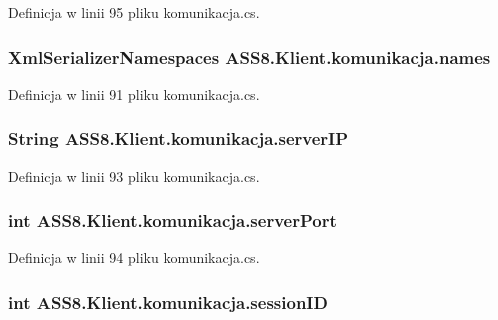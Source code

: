 Definicja w linii 95 pliku komunikacja.cs.\hypertarget{a00013_fad59850af421f7d3a2ad72f29fabe3d}{
\subsubsection[{names}]{\setlength{\rightskip}{0pt plus 5cm}XmlSerializerNamespaces {\bf ASS8.Klient.komunikacja.names}}}
\label{d7/dd4/a00013_fad59850af421f7d3a2ad72f29fabe3d}




Definicja w linii 91 pliku komunikacja.cs.\hypertarget{a00013_596f53c293d3811c950901c69c30aee4}{
\subsubsection[{serverIP}]{\setlength{\rightskip}{0pt plus 5cm}String {\bf ASS8.Klient.komunikacja.serverIP}}}
\label{d7/dd4/a00013_596f53c293d3811c950901c69c30aee4}




Definicja w linii 93 pliku komunikacja.cs.\hypertarget{a00013_6b37a2dd270fa5483aad7080a7ff71d4}{
\subsubsection[{serverPort}]{\setlength{\rightskip}{0pt plus 5cm}int {\bf ASS8.Klient.komunikacja.serverPort}}}
\label{d7/dd4/a00013_6b37a2dd270fa5483aad7080a7ff71d4}




Definicja w linii 94 pliku komunikacja.cs.\hypertarget{a00013_b992298af41161b42d77dbf23dfccad8}{
\subsubsection[{sessionID}]{\setlength{\rightskip}{0pt plus 5cm}int {\bf ASS8.Klient.komunikacja.sessionID}}}
\label{d7/dd4/a00013_b992298af41161b42d77dbf23dfccad8}




